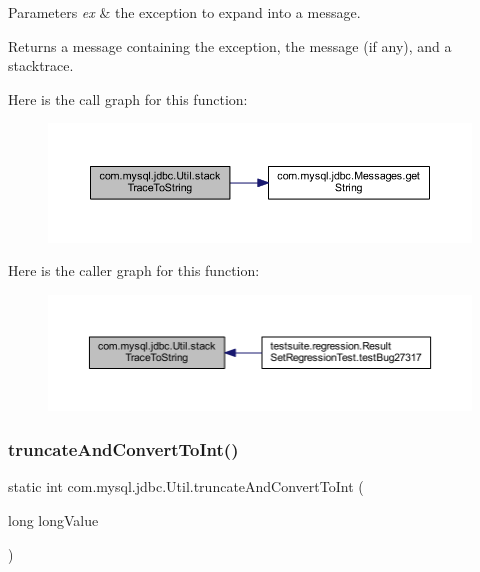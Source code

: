 \begin{DoxyParams}{Parameters}
{\em ex} & the exception to expand into a message.\\
\hline
\end{DoxyParams}
\begin{DoxyReturn}{Returns}
a message containing the exception, the message (if any), and a stacktrace. 
\end{DoxyReturn}
Here is the call graph for this function\+:
\nopagebreak
\begin{figure}[H]
\begin{center}
\leavevmode
\includegraphics[width=350pt]{classcom_1_1mysql_1_1jdbc_1_1_util_a1354e3d746b6b93b38b8d535acd977a4_cgraph}
\end{center}
\end{figure}
Here is the caller graph for this function\+:
\nopagebreak
\begin{figure}[H]
\begin{center}
\leavevmode
\includegraphics[width=350pt]{classcom_1_1mysql_1_1jdbc_1_1_util_a1354e3d746b6b93b38b8d535acd977a4_icgraph}
\end{center}
\end{figure}
\mbox{\label{classcom_1_1mysql_1_1jdbc_1_1_util_ab73dd640e4fb69c157001303d7be0164}} 
\subsubsection{\texorpdfstring{truncate\+And\+Convert\+To\+Int()}{truncateAndConvertToInt()}\hspace{0.1cm}{\footnotesize\ttfamily [1/2]}}
{\footnotesize\ttfamily static int com.\+mysql.\+jdbc.\+Util.\+truncate\+And\+Convert\+To\+Int (\begin{DoxyParamCaption}\item[{long}]{long\+Value }\end{DoxyParamCaption})\hspace{0.3cm}{\ttfamily [static]}}

